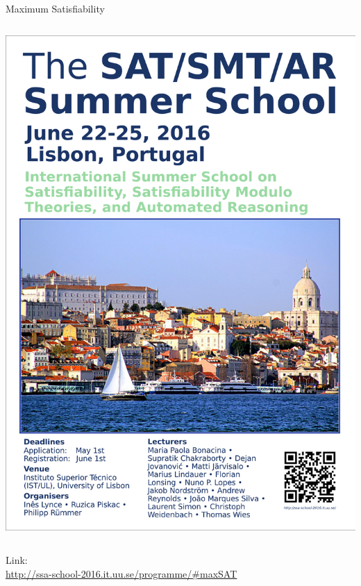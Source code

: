 \documentclass[t]{sdqbeamer}
\begin{document}
\begin{frame}{Maximum Satisfiability}
\begin{columns}
\begin{column}{0.3\textwidth}
\includegraphics[scale=0.12]{figures/l09/ssa-poster-school.pdf}
\end{column}
\end{columns}
Link:\\
\url{http://ssa-school-2016.it.uu.se/programme/\#maxSAT}
\end{frame}

{

}
\end{document}
